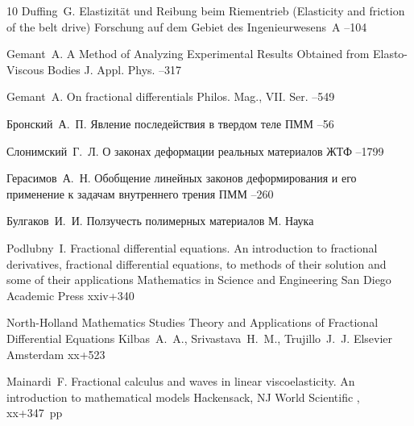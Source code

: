 \begin{thebibliography}{10}
\by Duffing~G.
\paper Elastizit\"at und Reibung beim Riementrieb (Elasticity and friction of the belt drive)
\jour Forschung auf dem Gebiet des Ingenieurwesens~A
--104


\by Gemant~A.
\paper A Method of Analyzing Experimental Results Obtained from Elasto-Viscous Bodies
\jour J. Appl. Phys.
--317

\by Gemant~A.
\paper On fractional differentials
\jour Philos. Mag., VII. Ser.
--549

\by Бронский~А.~П.
\paper Явление последействия в твердом теле
\jour ПММ
--56


\by Слонимский~Г.~Л.
\paper О законах деформации реальных материалов
\jour ЖТФ
--1799

\by Герасимов~А.~Н.
\paper Обобщение линейных законов деформирования и его применение к задачам внутреннего трения
\jour  ПММ
--260

\by Булгаков~И.~И.
\book Ползучесть полимерных материалов
\publaddr М.
\publ Наука

\by Podlubny~I.
\book Fractional differential equations. An introduction to fractional derivatives, fractional differential equations, to methods of their solution and some of their applications
\serial Mathematics in Science and Engineering
\publaddr San Diego
\publ Academic Press
\totalpages xxiv+340


\serial North-Holland Mathematics Studies
\book Theory and Applications of Fractional Differential Equations
\by Kilbas~A.~A., Srivastava~H.~M., Trujillo~J.~J.
\publ Elsevier
\publaddr Amsterdam
\totalpages xx+523


\by Mainardi~F.
\book Fractional calculus and waves in linear viscoelasticity. An introduction to mathematical models
\publaddr Hackensack, NJ
\publ World Scientific
,
\totalpages xx+347~pp


\end{thebibliography}
